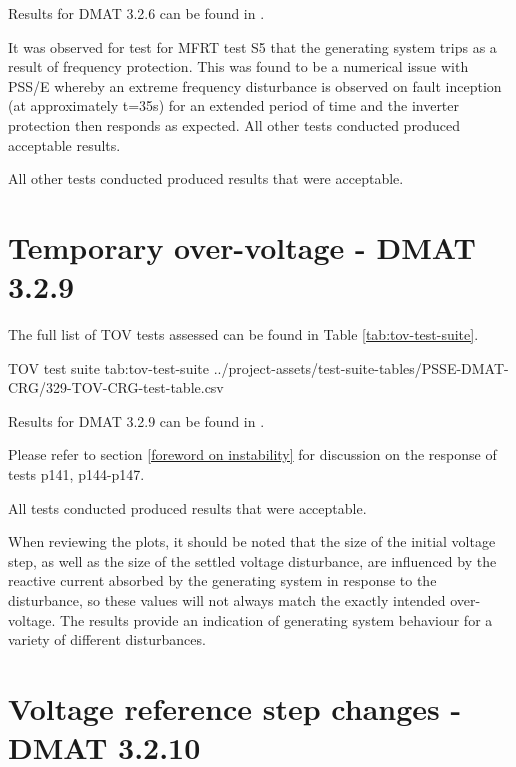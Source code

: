 \documentclass{../grid-link-report}
\newcommand{\projectassetsdir}{../project-assets}
\begin{document}
	Results for DMAT 3.2.6 can be found in .
	
	It was observed for test for MFRT test S5 that the generating system trips as a result of frequency protection. This was found to be a numerical issue with PSS/E whereby an extreme frequency disturbance is observed on fault inception (at approximately t=35s) for an extended period of time and the inverter protection then responds as expected. All other tests conducted produced acceptable results.

	All other tests conducted produced results that were acceptable.
	

	\section{Temporary over-voltage - DMAT 3.2.9}
	

	
	
	The full list of \ac{TOV} tests assessed can be found in Table \ref{tab:tov-test-suite}.
	
	{
		\fontsize{6}{8}\selectfont
		\autoscaledlongtable
		{TOV test suite}
		{tab:tov-test-suite}
		{\projectassetsdir/test-suite-tables/PSSE-DMAT-CRG/329-TOV-CRG-test-table.csv}
	}
	
	Results for DMAT 3.2.9 can be found in .
	
	
	Please refer to section \ref{foreword on instability} for discussion on the response of tests p141, p144-p147.
	
	All tests conducted produced results that were acceptable. 
	
	When reviewing the plots, it should be noted that the size of the initial voltage step, as well as the size of the settled voltage disturbance, are influenced by the reactive current absorbed by the generating system in response to the disturbance, so these values will not always match the exactly intended over-voltage. The results provide an indication of generating system behaviour for a variety of different disturbances.

	\section{Voltage reference step changes - DMAT 3.2.10}	
	\label{sec:vref-step-changes}
	

	
	
	
\end{document}
